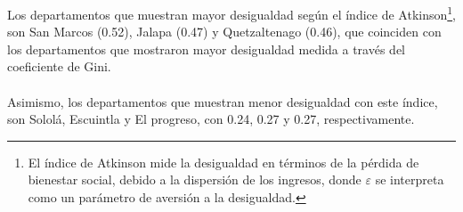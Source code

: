 Los departamentos que muestran mayor desigualdad según el índice de Atkinson\footnote{El índice de Atkinson mide la desigualdad en términos de la pérdida de bienestar social, debido a la dispersión de los ingresos, donde $\varepsilon$ se interpreta como un parámetro de aversión a la desigualdad.}, son San Marcos (0.52), Jalapa (0.47) y Quetzaltenago (0.46), que coinciden con los departamentos que mostraron mayor desigualdad medida a través del coeficiente de Gini.\\\\
 Asimismo, los departamentos que muestran menor desigualdad con este índice, son Sololá, Escuintla y El progreso, con 0.24, 0.27 y 0.27, respectivamente. 